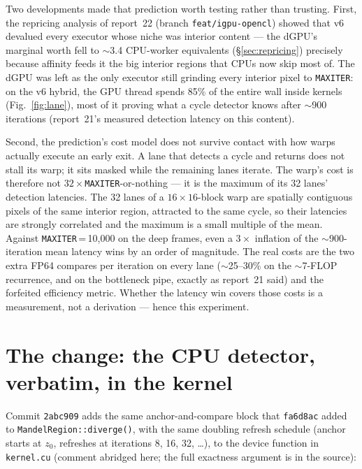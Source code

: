 \documentclass[
	english,
	letterpaper, oneside
]{article}
\begin{document}
Two developments made that prediction worth testing rather than trusting.
First, the repricing analysis of report~22 (branch \texttt{feat/igpu-opencl})
showed that v6 devalued every executor whose niche was interior content ---
the dGPU's marginal worth fell to $\sim$3.4 CPU-worker equivalents
(\S\ref{sec:repricing}) precisely because affinity feeds it the big interior
regions that CPUs now skip most of. The dGPU was left as the only
executor still grinding every interior pixel to \texttt{MAXITER}: on the v6
hybrid, the GPU thread spends 85\% of the entire wall inside kernels
(Fig.~\ref{fig:lane}), most of it proving what a cycle detector knows after
$\sim$900 iterations (report~21's measured detection latency on this
content).

Second, the prediction's cost model does not survive contact with how warps
actually execute an early exit. A lane that detects a cycle and returns does
not stall its warp; it sits masked while the remaining lanes iterate.
The warp's cost is therefore not $32\times$\texttt{MAXITER}-or-nothing --- it
is the maximum of its 32 lanes' detection latencies. The 32 lanes of a
$16\times16$-block warp are spatially contiguous pixels of the same interior
region, attracted to the same cycle, so their latencies are strongly
correlated and the maximum is a small multiple of the mean. Against
\texttt{MAXITER}\,=\,10{,}000 on the deep frames, even a $3\times$ inflation
of the $\sim$900-iteration mean latency wins by an order of magnitude. The
real costs are the two extra FP64 compares per iteration on every
lane ($\sim$25--30\% on the $\sim$7-FLOP recurrence, and on the bottleneck
pipe, exactly as report~21 said) and the forfeited efficiency metric. Whether
the latency win covers those costs is a measurement, not a derivation ---
hence this experiment.

\section{The change: the CPU detector, verbatim, in the kernel}
\label{sec:change}

Commit \texttt{2abc909} adds the same anchor-and-compare block that
\texttt{fa6d8ac} added to \texttt{MandelRegion::diverge()}, with the same
doubling refresh schedule (anchor starts at $z_0$, refreshes at iterations
8, 16, 32, \ldots), to the device function in \texttt{kernel.cu}
(comment abridged here; the full exactness argument is in the source):
\end{document}
